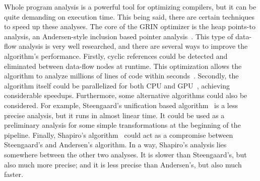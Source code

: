 \documentclass[main.tex]{subfiles}
\begin{document}
  Whole program analysis is a powerful tool for optimizing compilers, but it can be quite demanding on execution time. This being said, there are certain techniques to speed up these analyses. The core of the GRIN optimizer is the heap points-to analysis, an Andersen-style inclusion based pointer analysis~\cite{andersen-ptr}. This type of data-flow analysis is very well researched, and there are several ways to improve the algorithm's performance. Firstly, cyclic references could be detected and eliminated between data-flow nodes at runtime. This optimization allows the algorithm to analyze millions of lines of code within seconds~\cite{andersen-opt}. Secondly, the algorithm itself could be parallelized for both CPU and GPU~\cite{andersen-gpu}, achieving considerable speedups. Furthermore, some alternative algorithms could also be considered. For example, Steengaard's unification based algorithm~\cite{steensgaard-ptr} is a less precise analysis, but it runs in almost linear time. It could be used as a preliminary analysis for some simple transformations at the beginning of the pipeline. Finally, Shapiro's algorithm~\cite{shapiro-ptr} could act as a compromise between Steengaard's and Andersen's algorithm. In a way, Shapiro's analysis lies somewhere between the other two analyses. It is slower than Steengaard's, but also much more precise; and it is less precise than Andersen's, but also much faster.
	
\end{document}
